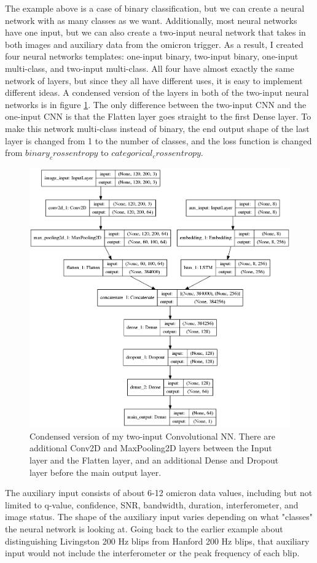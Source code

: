 \documentclass[a4paper]{article}
\begin{document}
The example above is a case of binary classification, but we can create a neural network with as many classes as we want. Additionally, most neural networks have one input, but we can also create a two-input neural network that takes in both images and auxiliary data from the omicron trigger. As a result, I created four neural networks templates: one-input binary, two-input binary, one-input multi-class, and two-input multi-class. All four have almost exactly the same network of layers, but since they all have different uses, it is easy to implement different ideas. A condensed version of the layers in both of the two-input neural networks is in figure \ref{fig:sup_condensed}. The only difference between the two-input CNN and the one-input CNN is that the Flatten layer goes straight to the first Dense layer. To make this network multi-class instead of binary, the end output shape of the last layer is changed from 1 to the number of classes, and the loss function is changed from $binary_crossentropy$ to $categorical_crossentropy$.

\begin{figure}[h!]
	\centering
	\includegraphics[width=.5\linewidth]{sup_condensed}
	\caption{Condensed version of my two-input Convolutional NN. There are additional Conv2D and MaxPooling2D layers between the Input layer and the Flatten layer, and an additional Dense and Dropout layer before the main output layer.}
	\label{fig:sup_condensed}
\end{figure}

The auxiliary input consists of about 6-12 omicron data values, including but not limited to q-value, confidence, SNR, bandwidth, duration, interferometer, and image status. The shape of the auxiliary input varies depending on what "classes" the neural network is looking at. Going back to the earlier example about distinguishing Livingston 200 Hz blips from Hanford 200 Hz blips, that auxiliary input would not include the interferometer or the peak frequency of each blip. 
\end{document}
